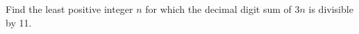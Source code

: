 Find the least positive integer $ n $ for which the decimal digit sum of $ 3n $ is divisible by 11.
